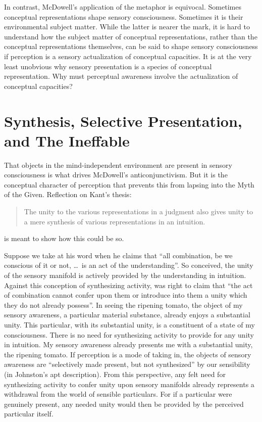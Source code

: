 \documentclass[12pt]{article}
\begin{document}
In contrast, McDowell's application of the metaphor is equivocal. Sometimes conceptual representations shape sensory consciousness. Sometimes it is their environmental subject matter. While the latter is nearer the mark, it is hard to understand how the subject matter of conceptual representations, rather than the conceptual representations themselves, can be said to shape sensory consciousness if perception is a sensory actualization of conceptual capacities. It is at the very least unobvious why sensory presentation is a species of conceptual representation. Why must perceptual awareness involve the actualization of conceptual capacities?


\section{Synthesis, Selective Presentation, and The Ineffable} %
\label{sec:selective_presentation_and_synthesis}

That objects in the mind-independent environment are present in sensory consciousness is what drives McDowell's anticonjunctivism. But it is the conceptual character of perception that prevents this from lapsing into the Myth of the Given. Reflection on Kant's thesis:
\begin{quote}
    The unity to the various representations in a judgment also gives unity to a mere synthesis of various representations in an intuition. \citep[A79/B104--5]{Kant:1781fk}
\end{quote}
is meant to show how this could be so.

Suppose we take \citet[B130]{Kant:1781fk} at his word when he claims that ``all combination, be we conscious of it or not, \ldots\ is an act of the understanding''. So conceived, the unity of the sensory manifold is actively provided by the understanding in intuition. Against this conception of synthesizing activity, \citet[226]{Prichard:1909yg} was right to claim that ``the act of combination cannot confer upon them or introduce into them a unity which they do not already possess''. In seeing the ripening tomato, the object of my sensory awareness, a particular material substance, already enjoys a substantial unity. This particular, with its substantial unity, is a constituent of a state of my consciousness. There is no need for synthesizing activity to provide for any unity in intuition. My sensory awareness already presents me with a substantial unity, the ripening tomato. If perception is a mode of taking in, the objects of sensory awareness are ``selectively made present, but not synthesized'' by our sensibility (in Johnston's \citeyear[285]{Johnston:2006uq} apt description). From this perspective, any felt need for synthesizing activity to confer unity upon sensory manifolds already represents a withdrawal from the world of sensible particulars. For if a particular were genuinely present, any needed unity would then be provided by the perceived particular itself.
\end{document}
